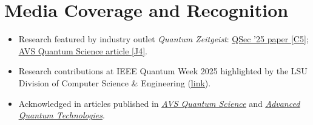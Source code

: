 \documentclass[letterpaper,11pt]{article}
\newcommand{\cvlink}[2]{\href{#1}{\underline{#2}}}
\newenvironment{cvblock}
  {\par\noindent\begin{minipage}[t]{\textwidth}\raggedright}
  {\end{minipage}\par\vspace{5pt}}
\begin{document}
\section{Media Coverage and Recognition}
\begin{cvblock}
\begin{itemize}
  \item Research featured by industry outlet \textit{Quantum Zeitgeist}:
        \cvlink{https://quantumzeitgeist.com/quantum-pulse-circuit-mapping-reveals-stealthy-crosstalk-attack-three/}{QSec '25 paper [C5]};
        \cvlink{https://quantumzeitgeist.com/enhanced-security-efficient-qubit-entangled-state-teleportation-achieves-partially/}{AVS Quantum Science article [J4]}.
  \item Research contributions at IEEE Quantum Week 2025 highlighted by the LSU Division of Computer Science \& Engineering
        (\cvlink{https://www.linkedin.com/posts/lsu-division-of-computer-science-engineering_lsu-quantumcomputing-researchexcellence-activity-7364405533233065984-xWiW}{link}).
  \item Acknowledged in articles published in
        \cvlink{https://pubs.aip.org/avs/aqs/article-abstract/8/1/013805/3380947/PCA-based-post-processing-in-quantum-process}{\textit{AVS Quantum Science}} and
        \cvlink{https://advanced.onlinelibrary.wiley.com/doi/10.1002/qute.70484}{\textit{Advanced Quantum Technologies}}.
\end{itemize}

\end{cvblock}
\end{document}
